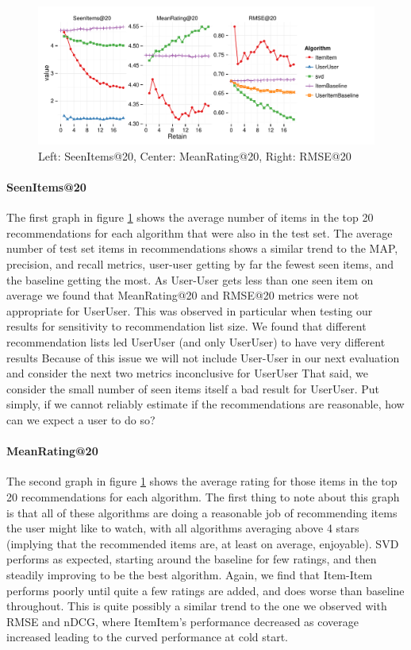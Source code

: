 \documentclass[letterpaper]{sig-alternate}
\begin{document}

\begin{figure}[ht!]
  \centering
  \includegraphics[width=\linewidth]{../lenskit/output/ekstrandTuned20/rmse_20.pdf}
  \caption{Left: SeenItems@20, Center: MeanRating@20, Right: RMSE@20}
  \label{fig:topN.rmse}
\end{figure}
  \paragraph{SeenItems@20}
  The first graph in figure \ref{fig:topN.rmse} shows the average number of items in the top 20 recommendations for each algorithm that were also in the test set.
  The average number of test set items in recommendations shows a similar trend to the MAP, precision, and recall metrics, user-user getting by far the fewest seen items, and the baseline getting the most.
  As User-User gets less than one seen item on average we found that MeanRating@20 and RMSE@20 metrics were not appropriate for UserUser.
  This was observed in particular when testing our results for sensitivity to recommendation list size.
  We found that different recommendation lists led UserUser (and only UserUser) to have very different results
  Because of this issue we will not include User-User in our next evaluation and consider the next two metrics inconclusive for UserUser
  That said, we consider the small number of seen items itself a bad result for UserUser.
  Put simply, if we cannot reliably estimate if the recommendations are reasonable, how can we expect a user to do so?

  \paragraph{MeanRating@20}
  The second graph in figure \ref{fig:topN.rmse} shows the average rating for those items in the top 20 recommendations for each algorithm.
  The first thing to note about this graph is that all of these algorithms are doing a reasonable job of recommending items the user might like to watch, with all algorithms averaging above 4 stars (implying that the recommended items are, at least on average, enjoyable).
  SVD performs as expected, starting around the baseline for few ratings, and then steadily improving to be the best algorithm.
  Again, we find that Item-Item performs poorly until quite a few ratings are added, and does worse than baseline throughout.
  This is quite possibly a similar trend to the one we observed with RMSE and nDCG, where ItemItem's performance decreased as coverage increased leading to the curved performance at cold start.
    
\end{document}
